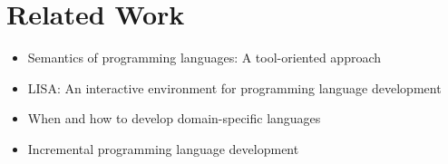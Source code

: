 \section{Related Work}\label{sec:related}

\begin{itemize}
  \item Semantics of programming languages: A tool-oriented approach~\cite{lda}
  \item LISA: An interactive environment for programming language
    development~\cite{lisa}
  \item When and how to develop domain-specific languages~\cite{dsl-survey}
  \item Incremental programming language development~\cite{ipld}
\end{itemize}

\todo
